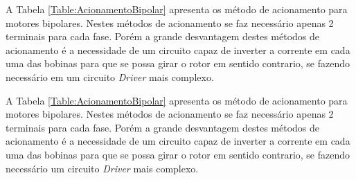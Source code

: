 A Tabela \ref{Table:AcionamentoBipolar} apresenta os método de acionamento para motores bipolares. Nestes métodos de acionamento se faz necessário apenas 2 terminais para cada fase. Porém a grande desvantagem destes métodos de acionamento é a necessidade de um circuito capaz de inverter a corrente em cada uma das bobinas para que se possa girar o rotor em sentido contrario, se fazendo necessário em um circuito \emph{Driver} mais complexo. 

A Tabela \ref{Table:AcionamentoBipolar} apresenta os método de acionamento para motores bipolares. Nestes métodos de acionamento se faz necessário apenas 2 terminais para cada fase. Porém a grande desvantagem destes métodos de acionamento é a necessidade de um circuito capaz de inverter a corrente em cada uma das bobinas para que se possa girar o rotor em sentido contrario, se fazendo necessário um circuito \emph{Driver} mais complexo. 


